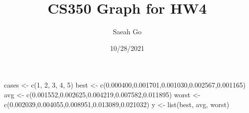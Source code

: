 \documentclass[
]{article}
\title{CS350 Graph for HW4}
\author{Saeah Go}
\date{10/28/2021}
\newenvironment{Shaded}{\begin{snugshade}}{\end{snugshade}}
\newcommand{\DecValTok}[1]{\textcolor[rgb]{0.00,0.00,0.81}{#1}}
\newcommand{\FloatTok}[1]{\textcolor[rgb]{0.00,0.00,0.81}{#1}}
\newcommand{\FunctionTok}[1]{\textcolor[rgb]{0.00,0.00,0.00}{#1}}
\newcommand{\NormalTok}[1]{#1}
\newcommand{\OtherTok}[1]{\textcolor[rgb]{0.56,0.35,0.01}{#1}}
\begin{document}
\maketitle

\begin{Shaded}
\begin{Highlighting}[]
\NormalTok{cases }\OtherTok{\textless{}{-}} \FunctionTok{c}\NormalTok{(}\DecValTok{1}\NormalTok{, }\DecValTok{2}\NormalTok{, }\DecValTok{3}\NormalTok{, }\DecValTok{4}\NormalTok{, }\DecValTok{5}\NormalTok{) }
\NormalTok{best }\OtherTok{\textless{}{-}} \FunctionTok{c}\NormalTok{(}\FloatTok{0.000400}\NormalTok{,}\FloatTok{0.001701}\NormalTok{,}\FloatTok{0.001030}\NormalTok{,}\FloatTok{0.002567}\NormalTok{,}\FloatTok{0.001165}\NormalTok{)}
\NormalTok{avg }\OtherTok{\textless{}{-}} \FunctionTok{c}\NormalTok{(}\FloatTok{0.001552}\NormalTok{,}\FloatTok{0.002625}\NormalTok{,}\FloatTok{0.004219}\NormalTok{,}\FloatTok{0.007582}\NormalTok{,}\FloatTok{0.011895}\NormalTok{)}
\NormalTok{worst }\OtherTok{\textless{}{-}} \FunctionTok{c}\NormalTok{(}\FloatTok{0.002039}\NormalTok{,}\FloatTok{0.004055}\NormalTok{,}\FloatTok{0.008951}\NormalTok{,}\FloatTok{0.013089}\NormalTok{,}\FloatTok{0.021032}\NormalTok{)}
\NormalTok{y }\OtherTok{\textless{}{-}} \FunctionTok{list}\NormalTok{(best, avg, worst)}


\end{Highlighting}
\end{Shaded}
\end{document}
